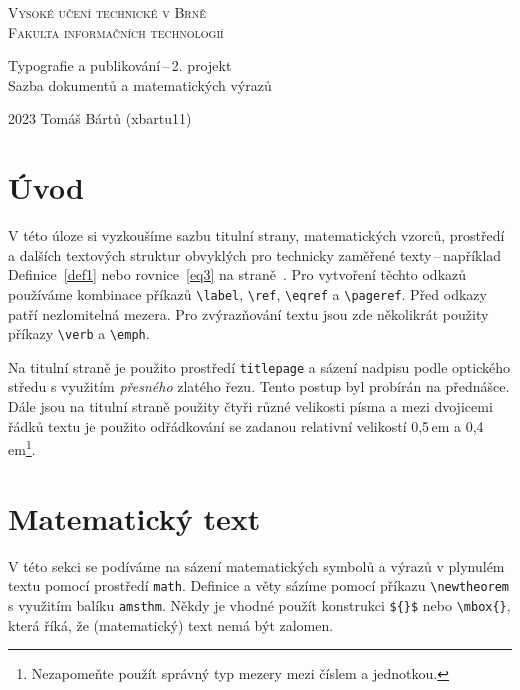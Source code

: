 \documentclass[a4paper,twocolumn,11pt]{article}[06-03-2022]
\theoremstyle{definition}
\begin{document}
\begin{titlepage}
    \begin{center}
        {\Huge \textsc{Vysoké učení technické v Brně} \\
        \vspace{0.5em}
        \huge\textsc{Fakulta informačních technologií}}
        

        {\LARGE Typografie a publikování\,--\,2. projekt \\
        \vspace{0.4em}
        Sazba dokumentů a matematických výrazů}
        
    \end{center}
    { \Large 2023 \hfill Tomáš Bártů (xbartu11) }    
\end{titlepage}


\section*{Úvod}
V této úloze si vyzkoušíme sazbu titulní strany, matematických vzorců, prostředí a dalších textových struktur obvyklých pro technicky zaměřené texty\,--\,například Definice~\ref{def1} nebo rovnice~\eqref{eq3} na straně~\pageref{eq3}. 
Pro vytvoření těchto odkazů používáme kombinace příkazů \verb|\label|, \verb|\ref|, \verb|\eqref| a \verb|\pageref|.
Před odkazy patří nezlomitelná mezera.
Pro zvýrazňování textu jsou zde několikrát použity příkazy \verb|\verb| a \verb|\emph|. 

Na titulní straně je použito prostředí \texttt{titlepage} a sázení nadpisu podle optického středu s využitím \emph{přesného} zlatého řezu. 
Tento postup byl probírán na přednášce. 
Dále jsou na titulní straně použity čtyři různé velikosti písma a mezi dvojicemi řádků textu je použito odřádkování se zadanou relativní velikostí 0,5\,em a 0,4\,em\footnote{Nezapomeňte použít správný typ mezery mezi číslem a jednotkou.}.

\section{Matematický text}
V této sekci se podíváme na sázení matematických symbolů a výrazů v plynulém textu pomocí prostředí \texttt{math}.
Definice a věty sázíme pomocí příkazu \verb|\newtheorem| s využitím balíku \texttt{amsthm}.
Někdy je vhodné použít konstrukci \verb|${}$| nebo \verb|\mbox{}|, která říká, že (matematický) text nemá být zalomen.
\end{document}
